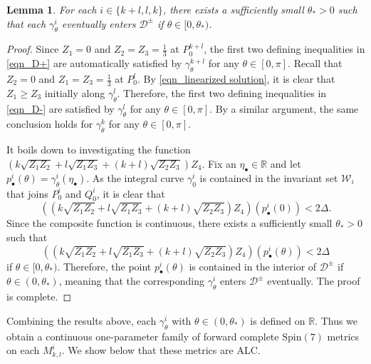 \documentclass[11pt,letterpaper]{amsart}
\newtheorem{lemma}[theorem]{Lemma}
\theoremstyle{definition}
\numberwithin{equation}{section}
\newcommand{\spin}{\mathrm{Spin}}
\begin{document}
\begin{lemma}
\label{lem_ALC metrics}
For each $i\in \{k+l,l,k\}$, there exists a sufficiently small $\theta_*>0$ such that each $\gamma_{\theta}^{i}$ eventually enters $\mathcal{D}^\pm$ if $\theta\in [0,\theta_*)$.
\end{lemma}
\begin{proof}
Since $Z_1=0$ and $Z_2=Z_3=\frac{1}{3}$ at $P_0^{k+l}$, the first two defining inequalities in \eqref{eqn_D+} are automatically satisfied by $\gamma_\theta^{k+l}$ for any $\theta\in [0,\pi]$. Recall that $Z_2=0$ and $Z_1=Z_3=\frac{1}{3}$ at $P_0^l$. By \eqref{eqn_linearized solution}, it is clear that $Z_1\geq Z_3$ initially along $\gamma_\theta^{l}$. Therefore, the first two defining inequalities in \eqref{eqn_D-} are satisfied by $\gamma_\theta^{l}$ for any $\theta\in [0,\pi]$. By a similar argument, the same conclusion holds for $\gamma_\theta^{k}$ for any $\theta\in [0,\pi]$. 

It boils down to investigating the function $\left(k\sqrt{Z_1Z_2}+l\sqrt{Z_1Z_3}+(k+l)\sqrt{Z_2Z_3}\right)Z_4$.
Fix an $\eta_\bullet\in\mathbb{R}$ and let $p^i_\bullet(\theta)=\gamma_{\theta}^{i}(\eta_\bullet)$. As the integral curve $\gamma_0^i$ is contained in the invariant set $\mathcal{W}_i$ that joins $P_0^i$ and $Q_0^i$, it is clear that 
$$\left(\left(k\sqrt{Z_1Z_2}+l\sqrt{Z_1Z_3}+(k+l)\sqrt{Z_2Z_3}\right)Z_4\right)(p^i_\bullet(0))<2\Delta.$$
Since the composite function is continuous, there exists a sufficiently small $\theta_*>0$ such that 
$$\left(\left(k\sqrt{Z_1Z_2}+l\sqrt{Z_1Z_3}+(k+l)\sqrt{Z_2Z_3}\right)Z_4\right)(p^i_\bullet(\theta))<2\Delta$$
if $\theta\in [0,\theta_*)$.
Therefore, the point $p^i_\bullet(\theta)$ is contained in the interior of $\mathcal{D}^\pm$ if $\theta\in (0,\theta_*)$, meaning that the corresponding $\gamma_\theta^i$ enters $\mathcal{D}^\pm$ eventually. The proof is complete.
\end{proof}

Combining the results above, each $\gamma_\theta^{i}$ with $\theta\in(0,\theta_*)$ is defined on $\mathbb{R}$. Thus we obtain a continuous one-parameter family of forward complete $\spin(7)$ metrics on each $M_{k,l}^{i}$. We show below that these metrics are ALC.
\end{document}
